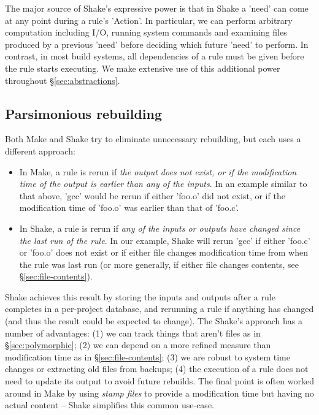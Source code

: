 The major source of Shake's expressive power is that in Shake a \lst'need' can
come at any point during a rule's \lst'Action'. In particular, we can perform
arbitrary computation including I/O, running system commands and examining files
produced by a previous \lst'need' before deciding which future \lst'need' to
perform. In contrast, in most build systems, all dependencies of a rule must be
given before the rule starts executing. We make extensive use of this additional
power throughout \S\ref{sec:abstractions}.

\subsection{Parsimonious rebuilding}

Both Make and Shake try to eliminate unnecessary rebuilding, but each
uses a different approach:

\begin{itemize}
\item In Make, a rule is rerun if \emph{the output does not exist, or if the
modification time of the output is earlier than any of the inputs}. In an example
similar to that above, \lst'gcc' would be rerun if either \lst'foo.o' did not
exist, or if the modification time of \lst'foo.o' was earlier than that of
\lst'foo.c'.
\item In Shake, a rule is rerun if \emph{any of the inputs or outputs have changed since the
last run of the rule}. In our example, Shake will rerun \lst'gcc' if
either \lst'foo.c' or \lst'foo.o' does not exist or if either file
changes modification time from when the rule was last run (or more
generally, if either file changes contents, see
\S\ref{sec:file-contents}).
\end{itemize}
\noindent
Shake achieves this result by storing the inputs and outputs after a rule
completes in a per-project database, and rerunning a rule if anything has
changed (and thus the result could be expected to change). The Shake's approach
has a number of advantages: (1) we can track things that aren't files as in
\S\ref{sec:polymorphic}; (2) we can depend on a more refined measure than
modification time as in \S\ref{sec:file-contents}; (3) we are robust to system
time changes or extracting old files from backups; (4) the execution of a rule
does not need to update its output to avoid future rebuilds. The final point is
often worked around in Make by using \emph{stamp files} to provide a modification
time but having no actual content -- Shake simplifies this common use-case.

